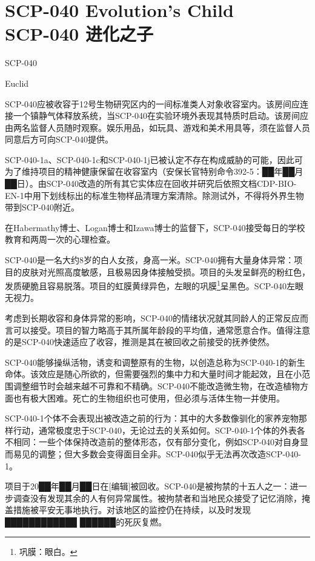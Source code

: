 \chapter[SCP-040 进化之子]{
    SCP-040 Evolution's Child\\
    SCP-040 进化之子
}

\label{chap:SCP-040}

SCP-040

Euclid

SCP-040应被收容于12号生物研究区内的一间标准类人对象收容室内。该房间应连接一个镇静气体释放系统，当SCP-040在实验环境外表现其特质时启动。该房间应由两名监督人员随时观察。娱乐用品，如玩具、游戏和美术用具等，须在监督人员同意后方可向SCP-040提供。

SCP-040-1a、SCP-040-1c和SCP-040-1j已被认定不存在构成威胁的可能，因此可为了维持项目的精神健康保留在收容室内（安保长官特别命令392-5：██年██月██日）。由SCP-040改造的所有其它实体应在回收并研究后依照文档CDP-BIO-EN-1中用下划线标出的标准生物样品清理方案清除。除测试外，不得将外界生物带到SCP-040附近。

在Habermathy博士、Logan博士和Izawa博士的监督下，SCP-040接受每日的学校教育和两周一次的心理检查。

SCP-040是一名大约8岁的白人女孩，身高一米。SCP-040拥有大量身体异常：项目的皮肤对光照高度敏感，且极易因身体接触受损。项目的头发呈鲜亮的粉红色，发质硬脆且容易脱落。项目的虹膜黄绿异色，左眼的巩膜\footnote{巩膜：眼白。}呈黑色。SCP-040左眼无视力。

考虑到长期收容和身体异常的影响，SCP-040的情绪状况就其同龄人的正常反应而言可以接受。项目的智力略高于其所属年龄段的平均值，通常愿意合作。值得注意的是SCP-040快速适应了收容，推测是其在被回收之前接受的抚养使然。

SCP-040能够操纵活物，诱变和调整原有的生物，以创造总称为SCP-040-1的新生命体。该效应是随心所欲的，但需要强烈的集中力和大量时间才能起效，且在小范围调整细节时会越来越不可靠和不精确。SCP-040不能改造微生物，在改造植物方面也有极大困难。死亡的生物组织也可使用，但必须与活体生物一并使用。

SCP-040-1个体不会表现出被改造之前的行为：其中的大多数像驯化的家养宠物那样行动，通常极度忠于SCP-040，无论过去的关系如何。SCP-040-1个体的外表各不相同：一些个体保持改造前的整体形态，仅有部分变化，例如SCP-040对自身显而易见的调整；但大多数会变得面目全非。SCP-040似乎无法再次改造SCP-040-1。

项目于20██年██月██日在{[}编辑]被回收。SCP-040是被拘禁的十五人之一：进一步调查没有发现其余的人有何异常属性。被拘禁者和当地民众接受了记忆消除，掩盖措施被平安无事地执行。对该地区的监控仍在持续，以及时发现████████████ ██████的死灰复燃。

